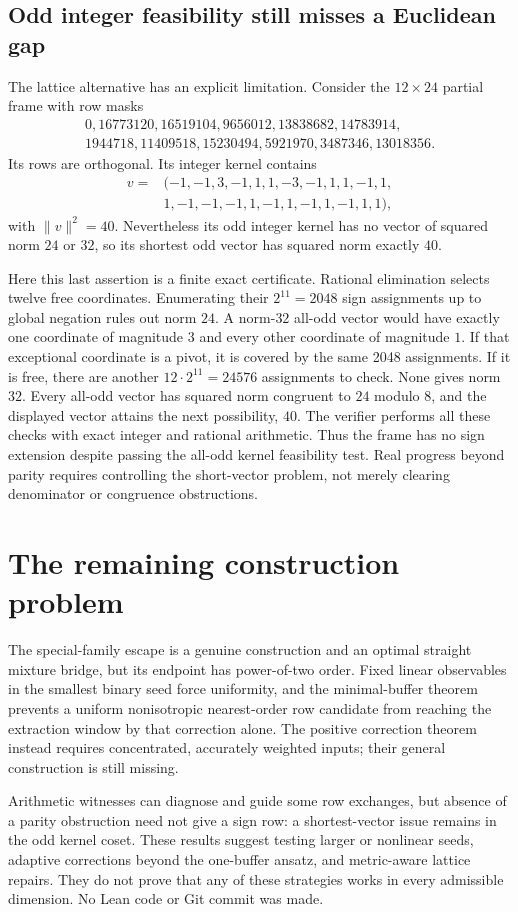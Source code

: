 \documentclass[11pt]{article}
\begin{document}
\subsection{Odd integer feasibility still misses a Euclidean gap}
The lattice alternative has an explicit limitation. Consider the
$12\times24$ partial frame with row masks
\[
\begin{gathered}
0,16773120,16519104,9656012,13838682,14783914,\\
1944718,11409518,15230494,5921970,3487346,13018356.
\end{gathered}
\]
Its rows are orthogonal. Its integer kernel contains
\[
\begin{split}
v={}&(-1,-1,3,-1,1,1,-3,-1,1,1,-1,1,\\
&1,-1,-1,-1,1,-1,1,-1,1,-1,1,1),
\end{split}
\]
with $\|v\|^2=40$. Nevertheless its odd integer kernel has no vector
of squared norm $24$ or $32$, so its shortest odd vector has squared
norm exactly $40$.

Here this last assertion is a finite exact certificate. Rational
elimination selects twelve free coordinates. Enumerating their
$2^{11}=2048$ sign assignments up to global negation rules out norm
$24$. A norm-$32$ all-odd vector would have exactly one coordinate
of magnitude $3$ and every other coordinate of magnitude $1$.
If that exceptional coordinate is a pivot, it is covered by the same
2048 assignments. If it is free, there are another
$12\cdot2^{11}=24576$ assignments to check. None gives norm $32$.
Every all-odd vector has squared norm congruent to $24$ modulo $8$,
and the displayed vector attains the next possibility, $40$.
The verifier performs all these checks with exact integer and rational
arithmetic. Thus the frame has no sign extension despite passing the
all-odd kernel feasibility test. Real progress beyond parity requires
controlling the short-vector problem, not merely clearing denominator
or congruence obstructions.

\section{The remaining construction problem}
The special-family escape is a genuine construction and an optimal
straight mixture bridge, but its endpoint has power-of-two order.
Fixed linear observables in the smallest binary seed force uniformity,
and the minimal-buffer theorem prevents a uniform nonisotropic
nearest-order row candidate from reaching the extraction window by
that correction alone. The positive correction theorem instead
requires concentrated, accurately weighted inputs; their general
construction is still missing.

Arithmetic witnesses can diagnose and guide some row exchanges,
but absence of a parity obstruction need not give a sign row: a
shortest-vector issue remains in the odd kernel coset. These results
suggest testing larger or nonlinear seeds, adaptive corrections
beyond the one-buffer ansatz, and metric-aware lattice repairs.
They do not prove that any of these strategies works in every
admissible dimension. No Lean code or Git commit was made.
\end{document}
